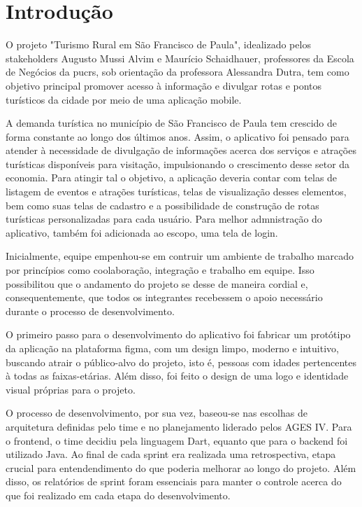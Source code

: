 \section[Introdução]{Introdução}

O projeto "Turismo Rural em São Francisco de Paula", idealizado pelos stakeholders Augusto Mussi Alvim e Maurício Schaidhauer, professores da Escola de Negócios da \ac{pucrs}, sob orientação da professora Alessandra Dutra, tem como objetivo principal promover acesso à informação e divulgar rotas e pontos turísticos da cidade por meio de uma aplicação mobile.

A demanda turística no município de São Francisco de Paula tem crescido de forma constante ao longo dos últimos anos. Assim, o aplicativo foi pensado para atender à necessidade de divulgação de informações acerca dos serviços e atrações turísticas disponíveis para visitação, impulsionando o crescimento desse setor da economia. Para atingir tal o objetivo, a aplicação deveria contar com telas de listagem de eventos e atrações turísticas, telas de visualização desses elementos, bem como suas telas de cadastro e a possibilidade de construção de rotas turísticas personalizadas para cada usuário. Para melhor admnistração do aplicativo, também foi adicionada ao escopo, uma tela de login.

Inicialmente, equipe empenhou-se em contruir um ambiente de trabalho marcado por princípios como coolaboração, integração e trabalho em equipe. Isso possibilitou que o andamento do projeto se desse de maneira cordial e, consequentemente, que todos os integrantes recebessem o apoio necessário durante o processo de desenvolvimento.

O primeiro passo para o desenvolvimento do aplicativo foi fabricar um protótipo da aplicação na plataforma figma, com um design limpo, moderno e intuitivo, buscando atrair o público-alvo do projeto, isto é, pessoas com idades pertencentes à todas as faixas-etárias. Além disso, foi feito o design de uma logo e identidade visual próprias para o projeto. 

O processo de desenvolvimento, por sua vez, baseou-se nas escolhas de arquitetura definidas pelo time e no planejamento liderado pelos AGES IV. Para o frontend, o time decidiu pela linguagem Dart, equanto que para o backend foi utilizado Java. Ao final de cada sprint era realizada uma retrospectiva, etapa crucial para entendendimento do que poderia melhorar ao longo do projeto. Além disso, os relatórios de sprint foram essenciais para manter o controle acerca do que foi realizado em cada etapa do desenvolvimento. 

